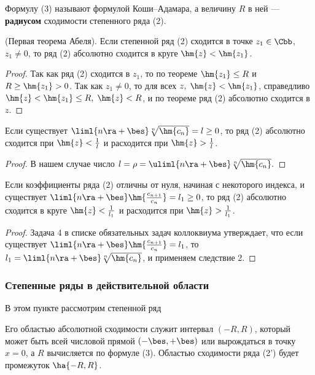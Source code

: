 \documentclass[a4paper]{article}
\begin{document}
Формулу (3) называют формулой Коши--Адамара, а величину $R$ в ней
--- \textbf{радиусом} сходимости степенного ряда (2).

\begin{imp}
(Первая теорема Абеля). Если степенной ряд (2) сходится в точке
$z_1\in\Cbb$, $z_1\ne0$, то ряд (2) абсолютно сходится в круге
$\hm{z}<\hm{z_1}$.
\end{imp}

\begin{proof}
Так как ряд (2) сходится в $z_1$, то по теореме $\hm{z_1}\le R$ и
$R\ge\hm{z_1}>0$. Так как $z_1\ne0$, то для всех $z, \;
\hm{z}<\hm{z_1}$, справедливо $\hm{z} < \hm{z_1} \le R, \;
\hm{z}<R$, и по теореме ряд (2) абсолютно сходится в $z$.
\end{proof}

\begin{imp}
Если существует $\liml{n\ra+\bes} \sqrt[n]{\hm{c_n}}=l\ge0$, то ряд
(2) абсолютно сходится при $\hm{z}<\frac1l$ и расходится при
$\hm{z}>\frac1l$.
\end{imp}

\begin{proof}
В нашем случае число $l=\rho = \uliml{n\ra+\bes}\sqrt[n]{\hm{c_n}}.$
\end{proof}

\begin{imp}
Если коэффициенты ряда (2) отличны от нуля, начиная с некоторого
индекса, и существует $\liml{n\ra+\bes} \hm{\frac{c_{n+1}}{c_n}} =
l_1\ge0$, то ряд (2) абсолютно сходится в круге $\hm{z} <
\frac1{l_1}$ и расходится при $\hm{z} > \frac1{l_1}$.
\end{imp}

\begin{proof}
Задача 4 в списке обязательных задач коллоквиума утверждает, что
если существует $\liml{n\ra+\bes} \hm{\frac{c_{n+1}}{c_n}}=l_1$, то
$l_1 = \liml{n\ra+\bes} \sqrt[n]{\hm{c_n}}$, и применяем следствие
2.
\end{proof}

\subsubsection{Степенные ряды в действительной области}
В этом пункте рассмотрим степенной ряд 

Его областью абсолютной сходимости служит интервал $(-R,R)$, который
может быть всей числовой прямой $(-\bes,+\bes)$ или вырождаться в
точку $x=0$, а $R$ вычисляется по формуле (3). Областью сходимости
ряда (2') будет промежуток $\ha{-R,R}$.
\end{document}
